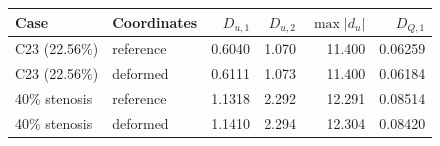 \begin{tabular}{@{}llrrrr@{}}
\toprule
Case & Coordinates & $D_{u,1}$ & $D_{u,2}$ & $\max |d_u|$ & $D_{Q,1}$ \\
\midrule
C23 (22.56\%) & reference & 0.6040 & 1.070 & 11.400 & 0.06259 \\
C23 (22.56\%) & deformed & 0.6111 & 1.073 & 11.400 & 0.06184 \\
40\% stenosis & reference & 1.1318 & 2.292 & 12.291 & 0.08514 \\
40\% stenosis & deformed & 1.1410 & 2.294 & 12.304 & 0.08420 \\
\bottomrule
\end{tabular}
